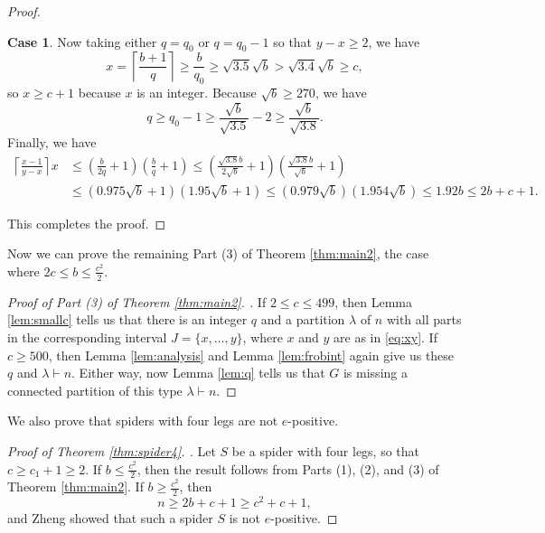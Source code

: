 \documentclass[12pt]{amsart}  %
\theoremstyle{definition}
\newtheorem{case}{Case}
\theoremstyle{remark}
\numberwithin{equation}{section}
\begin{document}
\begin{proof}
\begin{case}
Now taking either $q=q_0$ or $q=q_0-1$ so that $y-x\geq 2$, we have
\begin{equation*}
x=\left\lceil\frac{b+1}q\right\rceil\geq\frac b{q_0}\geq\sqrt{3.5}\sqrt b>\sqrt{3.4}\sqrt b\geq c,
\end{equation*}
so $x\geq c+1$ because $x$ is an integer. Because $\sqrt b\geq 270$, we have 
\begin{equation*}q\geq q_0-1\geq \frac{\sqrt b}{\sqrt{3.5}}-2\geq\frac{\sqrt b}{\sqrt{3.8}}.\end{equation*} Finally, we have
\begin{align*}
\left\lceil\frac{x-1}{y-x}\right\rceil x&\leq\left(\frac b{2q}+1\right)\left(\frac bq+1\right)\leq \left(\frac {\sqrt{3.8}b}{2\sqrt b}+1\right)\left(\frac{\sqrt{3.8}b}{\sqrt b}+1\right)\\&\leq(0.975\sqrt b+1)(1.95\sqrt b+1)\leq (0.979\sqrt b)(1.954\sqrt b)\leq 1.92b\leq 2b+c+1.
\end{align*}
\end{case}
This completes the proof.
\end{proof}

Now we can prove the remaining Part (3) of Theorem \ref{thm:main2}, the case where $2c\leq b\leq\frac{c^2}2$.

\begin{proof}[Proof of Part (3) of Theorem \ref{thm:main2}. ]
If $2\leq c\leq 499$, then Lemma \ref{lem:smallc} tells us that there is an integer $q$ and a partition $\lambda$ of $n$ with all parts in the corresponding interval $J=\{x,\ldots,y\}$, where $x$ and $y$ are as in \eqref{eq:xy}. If $c\geq 500$, then Lemma \ref{lem:analysis} and Lemma \ref{lem:frobint} again give us these $q$ and $\lambda\vdash n$. Either way, now Lemma \ref{lem:q} tells us that $G$ is missing a connected partition of this type $\lambda\vdash n$. 
\end{proof}

We also prove that spiders with four legs are not $e$-positive.

\begin{proof}[Proof of Theorem \ref{thm:spider4}. ]
Let $S$ be a spider with four legs, so that $c\geq c_1+1\geq 2$. If $b\leq \frac{c^2}2$, then the result follows from Parts (1), (2), and (3) of Theorem \ref{thm:main2}. If $b\geq\frac{c^2}2$, then 
\begin{equation*}n\geq 2b+c+1\geq c^2+c+1,\end{equation*}
and Zheng showed \cite[Corollary 4.6]{spiderepos} that such a spider $S$ is not $e$-positive.
\end{proof}
\end{document}
